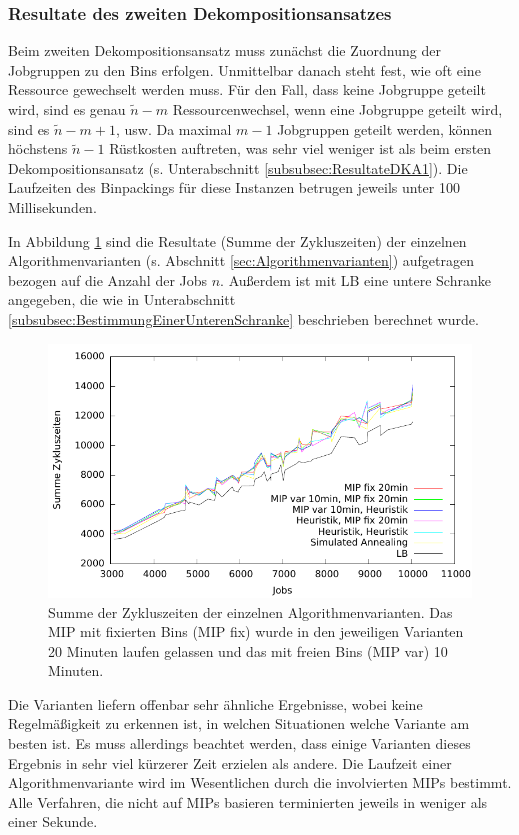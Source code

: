 \documentclass{scrreprt}
\begin{document}
\subsubsection{Resultate des zweiten Dekompositionsansatzes}
\label{subsubsec:ResultateDKA2}
Beim zweiten Dekompositionsansatz muss zunächst die Zuordnung der Jobgruppen zu den Bins erfolgen.
Unmittelbar danach steht fest, wie oft eine Ressource gewechselt werden muss. 
Für den Fall, dass keine Jobgruppe geteilt wird, sind es genau $\tilde{n}-m$ Ressourcenwechsel, wenn eine Jobgruppe geteilt wird, sind es $\tilde{n}-m+1$, usw.
Da maximal $m-1$ Jobgruppen geteilt werden, können höchstens $\tilde{n}-1$ Rüstkosten auftreten, was sehr viel weniger ist als beim ersten Dekompositionsansatz
(s. Unterabschnitt \ref{subsubsec:ResultateDKA1}).
Die Laufzeiten des Binpackings für diese Instanzen betrugen jeweils unter 100 Millisekunden.

In Abbildung \ref{abb:kbplotn} sind die Resultate (Summe der Zykluszeiten) der einzelnen Algorithmenvarianten (s. Abschnitt \ref{sec:Algorithmenvarianten}) aufgetragen
bezogen auf die Anzahl der Jobs $n$.
Außerdem ist mit LB eine untere Schranke angegeben, die wie in Unterabschnitt \ref{subsubsec:BestimmungEinerUnterenSchranke} beschrieben berechnet wurde.
\begin{figure}
    \begin{center}
        \includegraphics[width=.8\textwidth]{../prog/binpacking/results/kbplotn.pdf}
    \end{center}
    \caption{
        \label{abb:kbplotn}
        Summe der Zykluszeiten der einzelnen Algorithmenvarianten.
        Das MIP mit fixierten Bins (MIP fix) wurde in den jeweiligen Varianten 20 Minuten laufen gelassen
        und das mit freien Bins (MIP var) 10 Minuten.
    }
\end{figure}
Die Varianten liefern offenbar sehr ähnliche Ergebnisse, wobei keine Regelmäßigkeit zu erkennen ist, in welchen Situationen welche Variante am besten ist.
Es muss allerdings beachtet werden, dass einige Varianten dieses Ergebnis in sehr viel kürzerer Zeit erzielen als andere.
Die Laufzeit einer Algorithmenvariante wird im Wesentlichen durch die involvierten MIPs bestimmt.
Alle Verfahren, die nicht auf MIPs basieren terminierten jeweils in weniger als einer Sekunde.
\end{document}
